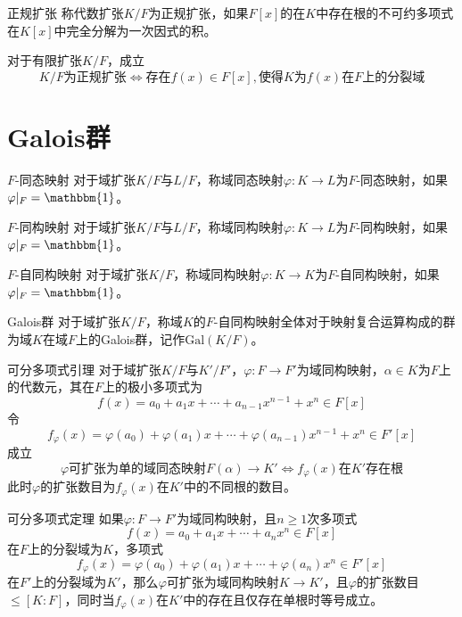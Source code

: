 \documentclass[lang = cn, scheme = chinese, thmcnt = section]{elegantbook}
\begin{document}
\begin{definition}{正规扩张}
	称代数扩张$K/F$为正规扩张，如果$F[x]$的在$K$中存在根的不可约多项式在$K[x]$中完全分解为一次因式的积。
\end{definition}

\begin{theorem}
	对于有限扩张$K/F$，成立
	$$
	K/F\text{为正规扩张}\iff \text{存在}f(x)\in F[x],\text{使得}K\text{为}f(x)\text{在}F\text{上的分裂域}
	$$
\end{theorem}

\section{Galois群}

\begin{definition}{$F$-同态映射}
	对于域扩张$K/F$与$L/F$，称域同态映射$\varphi:K\to L$为$F$-同态映射，如果$\varphi|_F=\mathbbm{1}$。
\end{definition}

\begin{definition}{$F$-同构映射}
	对于域扩张$K/F$与$L/F$，称域同构映射$\varphi:K\to L$为$F$-同构映射，如果$\varphi|_F=\mathbbm{1}$。
\end{definition}

\begin{definition}{$F$-自同构映射}
	对于域扩张$K/F$，称域同构映射$\varphi:K\to K$为$F$-自同构映射，如果$\varphi|_F=\mathbbm{1}$。
\end{definition}

\begin{definition}{Galois群}
	对于域扩张$K/F$，称域$K$的$F$-自同构映射全体对于映射复合运算构成的群为域$K$在域$F$上的Galois群，记作$\text{Gal}(K/F)$。
\end{definition}

\begin{lemma}{}{可分多项式引理}
	对于域扩张$K/F$与$K'/F'$，$\varphi:F\to F'$为域同构映射，$\alpha\in K$为$F$上的代数元，其在$F$上的极小多项式为
	$$
	f(x)=a_0+a_1x+\cdots+a_{n-1}x^{n-1}+x^n\in F[x]
	$$
	令
	$$
	f_\varphi(x)=\varphi(a_0)+\varphi(a_1)x+\cdots+\varphi(a_{n-1})x^{n-1}+x^n\in F'[x]
	$$
	成立
	$$
	\varphi\text{可扩张为单的域同态映射}F(\alpha)\to K'\iff
	f_\varphi(x)\text{在}K'\text{存在根}
	$$
	此时$\varphi$的扩张数目为$f_\varphi(x)$在$K'$中的不同根的数目。
\end{lemma}

\begin{theorem}{}{可分多项式定理}
	如果$\varphi:F\to F'$为域同构映射，且$n\ge 1$次多项式
	$$
	f(x)=a_0+a_1x+\cdots +a_nx^n\in F[x]
	$$
	在$F$上的分裂域为$K$，多项式
	$$
	f_\varphi(x)=\varphi(a_0)+\varphi(a_1)x+\cdots +\varphi(a_n)x^n\in F'[x]
	$$
	在$F'$上的分裂域为$K'$，那么$\varphi$可扩张为域同构映射$K\to K'$，且$\varphi$的扩张数目$\le [K:F]$，同时当$f_\varphi(x)$在$K'$中的存在且仅存在单根时等号成立。
\end{theorem}
\end{document}
